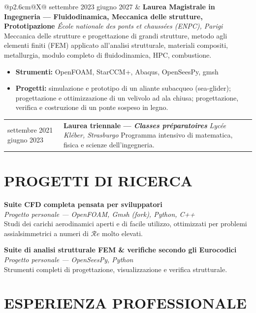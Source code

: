 \documentclass[a4paper,9pt]{extarticle}
\makeatletter
\newcommand{\entry}[4]{%
  \noindent
  \begin{tabularx}{\linewidth}{@{}p{2.6cm}@{\hspace{6pt}}X@{}}
    \small\textcolor{muted}{#1} &
    \textbf{#2} \newline
    \textit{\small\textcolor{muted}{#3}}
    #4
  \end{tabularx}
  \vspace{1pt}
}
\newcommand{\wideentry}[3]{%
  \noindent\textbf{#1}\\
  \textit{\small\textcolor{muted}{#2}}\\
  \small #3\par
  \vspace{1pt}
}
\makeatother
\begin{document}
\entry{settembre 2023 \newline giugno 2027}
  {Laurea Magistrale in Ingegneria — Fluidodinamica, Meccanica delle strutture, Prototipazione}
  {École nationale des ponts et chaussées (ENPC), Parigi}
  {\newline Meccanica delle strutture e progettazione di grandi strutture, metodo agli elementi finiti (FEM) applicato all'analisi strutturale, materiali compositi, metallurgia, modulo completo di fluidodinamica, HPC, combustione.
  \begin{itemize}
    \item \textbf{Strumenti:} OpenFOAM, StarCCM+, Abaqus, OpenSeesPy, gmsh
    \item \textbf{Progetti:} simulazione e prototipo di un aliante subacqueo (sea-glider); progettazione e ottimizzazione di un velivolo ad ala chiusa; progettazione, verifica e costruzione di un ponte sospeso in legno.
  \end{itemize}}

\entry{settembre 2021 \newline giugno 2023}
  {Laurea triennale — \textit{Classes préparatoires}}
  {Lycée Kléber, Strasburgo}
  {\newline Programma intensivo di matematica, fisica e scienze dell'ingegneria.
  }

\section{PROGETTI DI RICERCA}

\wideentry
  {Suite CFD completa pensata per sviluppatori}
  {Progetto personale — OpenFOAM, Gmsh (fork), Python, C++}
  {Studi dei carichi aerodinamici aperti e di facile utilizzo, ottimizzati per problemi assialsimmetrici a numeri di $\mathcal{R}e$ molto elevati.}

\wideentry
  {Suite di analisi strutturale FEM \& verifiche secondo gli Eurocodici}
  {Progetto personale — OpenSeesPy, Python}
  {Strumenti completi di progettazione, visualizzazione e verifica strutturale.}

\section{ESPERIENZA PROFESSIONALE}
\end{document}

